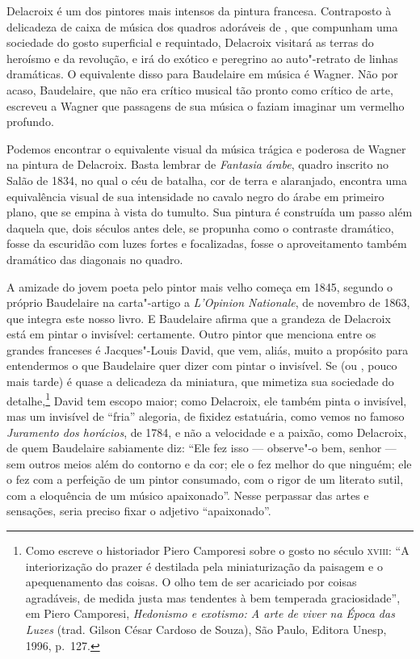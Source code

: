 Delacroix é um dos pintores mais intensos da pintura francesa.
Contraposto à delicadeza de caixa de música dos quadros adoráveis de
, que compunham uma sociedade do gosto superficial e requintado,
Delacroix visitará as terras do heroísmo e da revolução, e irá do
exótico e peregrino ao auto"-retrato de linhas dramáticas. O equivalente
disso para Baudelaire em música é Wagner. Não por acaso, Baudelaire,
que não era crítico musical tão pronto como crítico de arte, escreveu a
Wagner que passagens de sua música o faziam imaginar um vermelho
profundo. 

Podemos encontrar o equivalente visual da música trágica e poderosa de
Wagner na pintura de Delacroix. Basta lembrar de \textit{Fantasia
árabe}, quadro inscrito no Salão de 1834, no qual o céu de batalha, cor
de terra e alaranjado, encontra uma equivalência visual de sua
intensidade no cavalo negro do árabe em primeiro plano, que se empina à
vista do tumulto. Sua pintura é construída um passo além daquela que,
dois séculos antes dele, se propunha como o contraste dramático, fosse
da escuridão com luzes fortes e focalizadas, fosse o aproveitamento
também dramático das diagonais no quadro.

A amizade do jovem poeta pelo pintor mais velho começa em 1845, segundo
o próprio Baudelaire na carta"-artigo a \textit{L’Opinion Nationale}, de
novembro de 1863, que integra este nosso livro. E Baudelaire afirma que
a grandeza de Delacroix está em pintar o invisível: certamente. Outro
pintor que menciona entre os grandes franceses é Jacques"-Louis David,
que vem, aliás, muito a propósito para entendermos o que Baudelaire
quer dizer com pintar o invisível. Se  (ou , pouco mais
tarde) é quase a delicadeza da miniatura, que mimetiza sua sociedade do
detalhe,\footnote{ Como escreve o historiador Piero Camporesi sobre o 
gosto no século \textsc{xviii}: “A interiorização do prazer é destilada pela
miniaturização da paisagem e o apequenamento das coisas. O olho tem de
ser acariciado por coisas agradáveis, de medida justa mas tendentes à
bem temperada graciosidade”, em Piero Camporesi,
\textit{Hedonismo e exotismo: A arte de viver na Época das Luzes
}(trad. Gilson César Cardoso de Souza), São Paulo, Editora Unesp,
1996, p.~127.} David tem escopo maior; como Delacroix, ele também
pinta o invisível, mas um invisível de “fria” alegoria, de fixidez
estatuária, como vemos no famoso \textit{Juramento dos horácios}, de
1784, e não a velocidade e a paixão, como Delacroix, de quem Baudelaire
sabiamente diz: “Ele fez isso --- observe"-o bem, senhor --- sem outros
meios além do contorno e da cor; ele o fez melhor do que ninguém; ele o
fez com a perfeição de um pintor consumado, com o rigor de um literato
sutil, com a eloquência de um músico apaixonado”. Nesse perpassar das
artes e sensações, seria preciso fixar o adjetivo “apaixonado”.

